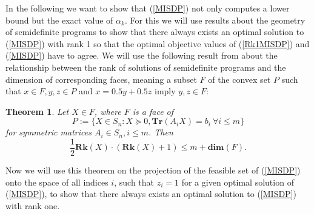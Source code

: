 \documentclass[a4paper,11pt,1p]{elsarticle}
\newtheorem{thm}{Theorem}
\newcommand{\Tr}{\textbf{Tr}}
\newcommand{\Rk}{\textbf{Rk}}
\begin{document}
In the following we want to show that (\ref{MISDP}) not only computes a lower bound but the exact value of $\alpha_k$. For this we will use results about the geometry of semidefinite programs to show that there always exists an 
optimal solution to (\ref{MISDP}) with rank 1 so that the optimal objective values of (\ref{Rk1MISDP}) and (\ref{MISDP}) have to agree. We will use the following result from \cite{pat98} about the relationship between the rank of
solutions of semidefinite programs and the dimension of corresponding faces, meaning a subset $F$ of the convex set $P$ such that $x \in F, y, z \in P$ and $x = 0.5y + 0.5z$ imply $y,z \in F$:

\begin{thm}\label{patakiLemma}
 Let $X \in F$, where $F$ is a face of
 \begin{equation*}
 P := \{X \in S_n : X \succeq 0, \Tr(A_i X) = b_i \ \forall i \leq m\}
 \end{equation*}
 for symmetric matrices $A_i \in S_n, i \leq m$. Then
 \begin{equation*}
  \frac{1}{2}\Rk(X)\cdot(\Rk(X)+1) \leq m + \textbf{dim}(F).
 \end{equation*}
\end{thm}

Now we will use this theorem on the projection of the feasible set of (\ref{MISDP}) onto the space of all indices $i$, such that $z_i = 1$ for a given optimal solution of (\ref{MISDP}), to show that there always exists an optimal 
solution to (\ref{MISDP}) with rank one.
\end{document}
